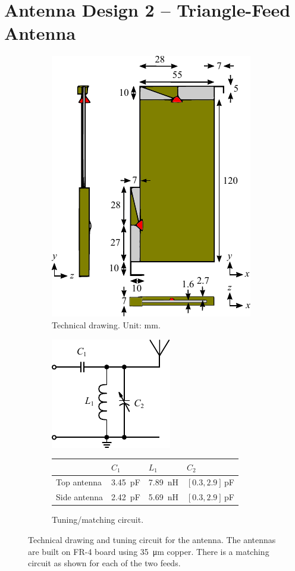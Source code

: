 \section{Antenna Design 2 -- Triangle-Feed Antenna}

\begin{figure}[htbp]
    \begin{subfigure}[b]{0.49\linewidth}
        \centering
        \includegraphics{img/tech_sol/trianglefeed/technical}
        \caption{Technical drawing. Unit: mm.}
        \label{fig:ant2technical}
    \end{subfigure}
    \hfill
    \begin{subfigure}[b]{0.49\linewidth}
        \centering
        \includegraphics{img/tech_sol/schematic_tuning_1}\\[1cm]
        \footnotesize
        \begin{tabular}{|l|l|l|l|}
            \hline
            & $C_1$ & $L_1$ & $C_2$ \\
            \hline
            Top antenna & \SI{3.45}{pF} & \SI{7.89}{nH} & $[0.3,2.9]\,$pF\\
            Side antenna & \SI{2.42}{pF} & \SI{5.69}{nH} & $[0.3,2.9]\,$pF\\
            \hline
        \end{tabular}
        \caption{Tuning/matching circuit.}
        \label{fig:ant2schematic}
    \end{subfigure}
    \caption{Technical drawing and tuning circuit for the antenna.  The antennas are built on FR-4 board using \SI{35}{\micro\meter} copper. There is a matching circuit as shown for each of the two feeds.}
    \label{fig:ant2techschem}
\end{figure}

